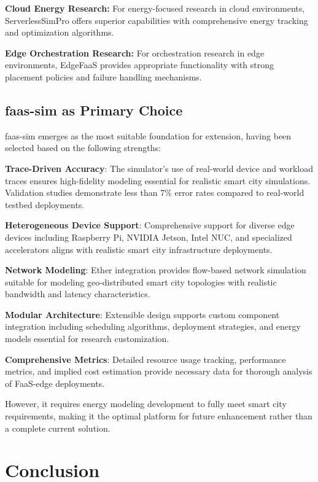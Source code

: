 \textbf{Cloud Energy Research:} For energy-focused research in cloud environments, ServerlessSimPro offers superior capabilities with comprehensive energy tracking and optimization algorithms.

\textbf{Edge Orchestration Research:} For orchestration research in edge environments, EdgeFaaS provides appropriate functionality with strong placement policies and failure handling mechanisms.

\subsection{faas-sim as Primary Choice}

faas-sim emerges as the most suitable foundation for extension, having been selected based on the following strengths:

\textbf{Trace-Driven Accuracy}: The simulator's use of real-world device and workload traces ensures high-fidelity modeling essential for realistic smart city simulations. Validation studies demonstrate less than 7\% error rates compared to real-world testbed deployments.

\textbf{Heterogeneous Device Support}: Comprehensive support for diverse edge devices including Raspberry Pi, NVIDIA Jetson, Intel NUC, and specialized accelerators aligns with realistic smart city infrastructure deployments.

\textbf{Network Modeling}: Ether \cite{rausch2020ether}  integration provides flow-based network simulation suitable for modeling geo-distributed smart city topologies with realistic bandwidth and latency characteristics.

\textbf{Modular Architecture}: Extensible design supports custom component integration including scheduling algorithms, deployment strategies, and energy models essential for research customization.

\textbf{Comprehensive Metrics}: Detailed resource usage tracking, performance metrics, and implied cost estimation provide necessary data for thorough analysis of FaaS-edge deployments.

However, it requires energy modeling development to fully meet smart city requirements, making it the optimal platform for future enhancement rather than a complete current solution.

\section{Conclusion}

